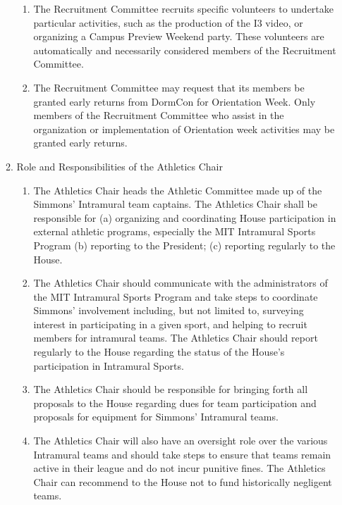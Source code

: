 \documentclass[letterpaper]{article}
\begin{document}
\begin{enumerate}
\begin{enumerate}
\begin{enumerate}
\item The Recruitment Committee recruits specific volunteers to undertake particular activities, such as the production of the I3 video, or organizing a Campus Preview Weekend party. These volunteers are automatically and necessarily considered members of the Recruitment Committee.

\item The Recruitment Committee may request that its members be granted early returns from DormCon for Orientation Week. Only members of the Recruitment Committee who assist in the organization or implementation of Orientation week activities may be granted early returns.

\end{enumerate}

\item Role and Responsibilities of the Athletics Chair

\begin{enumerate}

\item The Athletics Chair heads the Athletic Committee made up of the Simmons' Intramural team captains. The Athletics Chair shall be responsible for (a) organizing and coordinating House participation in external athletic programs, especially the MIT Intramural Sports Program (b) reporting to the President; (c) reporting regularly to the House.

\item The Athletics Chair should communicate with the administrators of the MIT Intramural Sports Program and take steps to coordinate Simmons' involvement including, but not limited to, surveying interest in participating in a given sport, and helping to recruit members for intramural teams. The Athletics Chair should report regularly to the House regarding the status of the House's participation in Intramural Sports.

\item The Athletics Chair should be responsible for bringing forth all proposals to the House regarding dues for team participation and proposals for equipment for Simmons' Intramural teams.

\item The Athletics Chair will also have an oversight role over the various Intramural teams and should take steps to ensure that teams remain active in their league and do not incur punitive fines. The Athletics Chair can recommend to the House not to fund historically negligent teams.


\end{enumerate}
\end{enumerate}
\end{enumerate}
\end{document}
